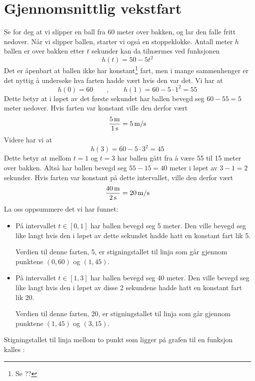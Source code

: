 





	
\section{Gjennomsnittlig vekstfart}
Se for deg at vi slipper en ball fra 60 meter over bakken, og lar den falle fritt nedover. Når vi slipper ballen, starter vi også en stoppeklokke. Antall meter $ h $ ballen er over bakken etter $ t $ sekunder kan da tilnærmes ved funksjonen
\[ h(t)=50-5t^2 \]
Det er åpenbart at ballen ikke har konstant\footnote{Se ??} fart, men i mange sammenhenger er det nyttig å undersøke hva farten hadde vært hvis den var det. Vi har at
\[ h(0)=60\qquad,\qquad h(1)=60-5\cdot1^2=55 \]
Dette betyr at i løpet av det første sekundet har ballen bevegd seg $ {60-55=5} $ meter nedover. Hvis farten var konstant ville den derfor vært
\[ \frac{5\,\textrm{m}}{1\,\textrm{s}}=5\,\textrm{m/s} \]
Videre har vi at
\[ h(3)=60-5\cdot3^2 =45  \]
Dette betyr at mellom $ {t=1} $ og $ {t=3} $ har ballen gått fra å være 55 til 15 meter over bakken. Altså har ballen bevegd seg $ {55-15=40} $ meter i løpet av $ {3-1=2} $ sekunder. Hvis farten var konstant på dette intervallet, ville den derfor vært
\[ \frac{40\,\textrm{m}}{2\,\textrm{s}}=20\,\textrm{m/s} \] 
\label{eksvekstfart}
\newpage
La oss oppsummere det vi har funnet:
\begin{itemize}
	\item På intervallet $ t\in[0, 1] $ har ballen bevegd seg 5 meter. Den ville bevegd seg like langt hvis den i løpet av dette sekundet hadde hatt en konstant fart lik 5. \os
	
	Verdien til denne farten, 5, er stigningstallet til linja som går gjennom punktene $ (0, 60) $ og $ (1, 45) $.
	\item På intervallet $ t\in[1, 3] $ har ballen bevegd seg 40 meter. Den ville bevegd seg like langt hvis den i løpet av disse 2 sekundene hadde hatt en konstant fart lik 20.\os
	
	Verdien til denne farten, 20, er stigningstallet til linja som går gjennom punktene $ (1, 45) $ og $ (3, 15) $.
\end{itemize}
Stigningstallet til linja mellom to punkt som ligger på grafen til en funksjon kalles :\regv

